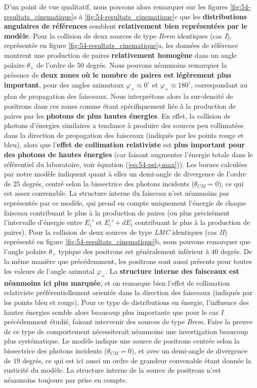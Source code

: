 \begin{refsection}
D'un point de vue qualitatif, nous pouvons alors remarquer sur les figures \ref{fig:54-resultats_cinematique}a à \ref{fig:54-resultats_cinematique}c que les \textbf{distributions angulaires de références} semblent \textbf{relativement bien représentées par le modèle}. Pour la collision de deux sources de type \textit{Brem} identiques (cas \textit{I}), représentée en figure \ref{fig:54-resultats_cinematique}a, les données de référence montrent une production de paires \textbf{relativement homogène} dans un angle polaire $\theta_+$ de l'ordre de $50$ degrés. Nous pouvons néanmoins remarquer la présence de \textbf{deux zones où le nombre de paires est légèrement plus important}, pour des angles azimutaux $\varphi_+ \approx 0^\circ$ et $\varphi_+ \approx 180^\circ$, correspondant au plan de propagation des faisceaux. Nous interprétons alors la sur-densité de positrons dans ces zones comme étant spécifiquement liée à la production de paires par les \textbf{photons de plus hautes énergies}. En effet, la collision de photons d'énergies similaires a tendance à produire des sources peu collimatées dans la direction de propagation des faisceaux (indiqués par les points rouge et bleu), alors que l'\textbf{effet de collimation relativiste} est \textbf{plus important pour des photons de hautes énergies} (car faisant augmenter l'énergie totale dans le référentiel du laboratoire, voir équation (\ref{eq:54-psi+max})). Les bornes calculées par notre modèle indiquent quant à elles un demi-angle de divergence de l'ordre de $25$ degrés, centré selon la bissectrice des photons incidents ($\theta_{CM}=0$), ce qui est assez convenable. La structure interne du faisceau n'est néanmoins pas représentée par ce modèle, qui prend en compte uniquement l'énergie de chaque faisceau contribuant le plus à la production de paires (ou plus précisément l'intervalle d'énergie entre $E_i'$ et $E_i'+dE_i$ contribuant le plus à la production de paires). 
Pour la collision de deux sources de type \textit{LMC} identiques (cas \textit{II}) représenté en figure \ref{fig:54-resultats_cinematique}b, nous pouvons remarquer que l'angle polaire $\theta_+$ typique des positrons est généralement inférieur à $40$ degrés. De la même manière que précédemment, les positrons sont aussi présents pour toutes les valeurs de l'angle azimutal $\varphi_+$. La \textbf{structure interne des faisceaux est néanmoins ici plus marquée}, et on remarque bien l'effet de collimation relativiste préférentiellement orientée dans la direction des faisceaux (indiqués par les points bleu et rouge). Pour ce type de distributions en énergie, l'influence des hautes énergies semble alors beaucoup plus importante que pour le cas \textit{I} précédemment étudié, faisant intervenir des sources de type \textit{Brem}. Faire la preuve de ce type de comportement nécessiterait néanmoins une investigation beaucoup plus systématique. Le modèle indique une source de positrons centrée selon la bissectrice des photons incidents ($\theta_{CM}=0$), et avec un demi-angle de divergence de $19$ degrés, ce qui est ici aussi un ordre de grandeur convenable étant donnée la rusticité du modèle. La structure interne de la source de positrons n'est néanmoins toujours par prise en compte. 

\end{refsection}
